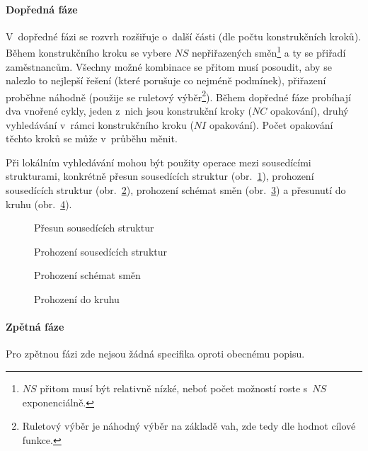 \documentclass[twoside]{ctuthesis}
\begin{document}
\paragraph{Dopředná fáze} V~dopředné fázi se rozvrh rozšiřuje o~další části (dle počtu konstrukčních kroků). Během konstrukčního kroku se vybere $NS$ nepřiřazených směn\footnote{$NS$ přitom musí být relativně nízké, neboť počet možností roste s~$NS$ exponenciálně. } a ty se přiřadí zaměstnancům. Všechny možné kombinace se přitom musí posoudit, aby se nalezlo to nejlepší řešení (které porušuje co nejméně podmínek), přiřazení proběhne náhodně (použije se ruletový výběr\footnote{Ruletový výběr je náhodný výběr na základě vah, zde tedy dle hodnot cílové funkce.}). Během dopředné fáze probíhají dva vnořené cykly, jeden z~nich jsou konstrukční kroky ($NC$ opakování), druhý vyhledávání v~rámci konstrukčního kroku ($NI$ opakování). Počet opakování těchto kroků se může v~průběhu měnit.

Při lokálním vyhledávání mohou být použity operace mezi sousedícími strukturami, konkrétně přesun sousedících struktur (obr.~\ref{fig:abc-msn}), prohození sousedících struktur (obr.~\ref{fig:abc-sns}), prohození schémat směn (obr.~\ref{fig:abc-sps}) a přesunutí do kruhu (obr.~\ref{fig:abc-trm}).

\begin{figure}[h]
	
	\caption{Přesun sousedících struktur}
	\label{fig:abc-msn}
\end{figure}

\begin{figure}[h!]
	
	\caption{Prohození sousedících struktur}
	\label{fig:abc-sns}
\end{figure}


\begin{figure}[h!]
	
	\caption{Prohození schémat směn}
	\label{fig:abc-sps}
\end{figure}

\begin{figure}[h!]
	
	\caption{Prohození do kruhu}
	\label{fig:abc-trm}
\end{figure}

\paragraph{Zpětná fáze} Pro zpětnou fázi zde nejsou žádná specifika oproti obecnému popisu.

\newpage
\end{document}
